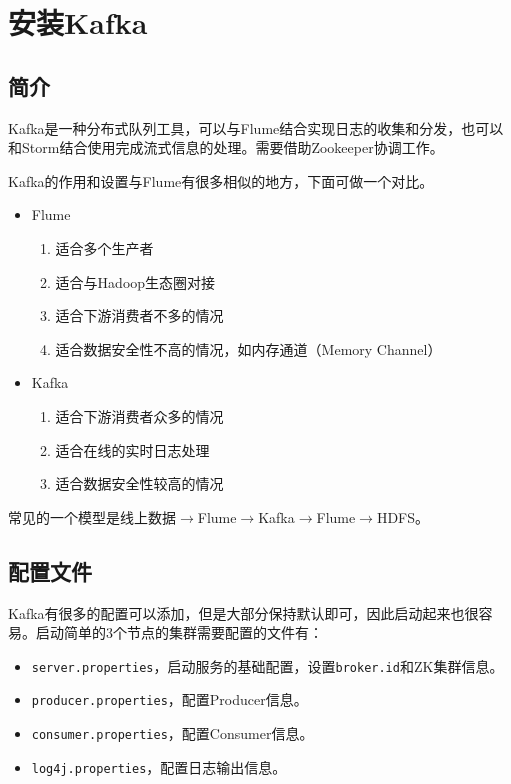 \section{安装Kafka}

\subsection{简介}

Kafka是一种分布式队列工具，可以与Flume结合实现日志的收集和分发，也可以和Storm结合使用完成流式信息的处理。需要借助Zookeeper协调工作。

Kafka的作用和设置与Flume有很多相似的地方，下面可做一个对比。

\begin{itemize}
	\item Flume
		\begin{enumerate}
			\item 适合多个生产者
			\item 适合与Hadoop生态圈对接
			\item 适合下游消费者不多的情况
			\item 适合数据安全性不高的情况，如内存通道（Memory Channel）
		\end{enumerate}
	\item Kafka
		\begin{enumerate}
			\item 适合下游消费者众多的情况
			\item 适合在线的实时日志处理
			\item 适合数据安全性较高的情况
		\end{enumerate}
\end{itemize}

常见的一个模型是线上数据\(\rightarrow\)Flume\(\rightarrow\)Kafka\(\rightarrow\)Flume\(\rightarrow\)HDFS。

\subsection{配置文件}

Kafka有很多的配置可以添加，但是大部分保持默认即可，因此启动起来也很容易。启动简单的3个节点的集群需要配置的文件有：

\begin{itemize}
    \item \lstinline{server.properties}，启动服务的基础配置，设置\lstinline{broker.id}和ZK集群信息。
    \item \lstinline{producer.properties}，配置Producer信息。
    \item \lstinline{consumer.properties}，配置Consumer信息。
    \item \lstinline{log4j.properties}，配置日志输出信息。
\end{itemize}

